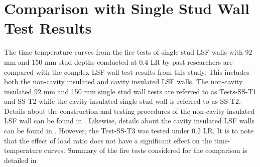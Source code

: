 \section{Comparison with Single Stud Wall Test Results}

The time-temperature curves from the fire tests of single stud LSF walls with 92 mm and 150 mm stud depths conducted at 0.4 LR by past researchers are compared with the complex LSF wall test results from this study. This includes both the non-cavity insulated and cavity insulated LSF walls. The non-cavity insulated 92 mm and 150 mm single stud wall tests are referred to as Tests-SS-T1 and SS-T2 while the cavity insulated single stud wall is referred to as SS-T2. Details about the construction and testing procedures of the non-cavity insulated LSF wall can be found in \citet{Ariyanayagam2018c}. Likewise, details about the cavity insulated LSF walls can be found in \citet{Gunalan2013e}. However, the Test-SS-T3 was tested under 0.2 LR. It is to note that the effect of load ratio does not have a significant effect on the time-temperature curves. Summary of the fire tests considered for the comparison is detailed in  
